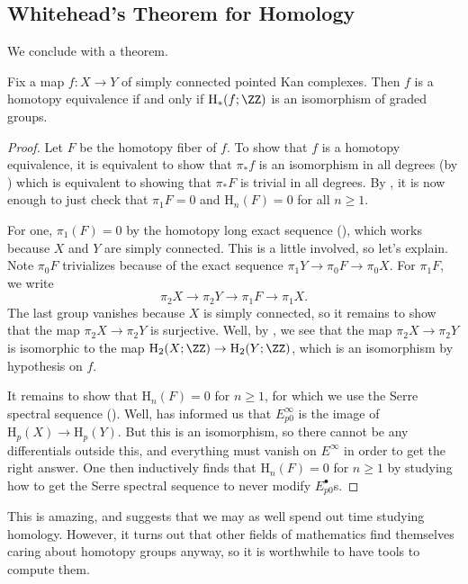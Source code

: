 \documentclass[../notes.tex]{subfiles}
\begin{document}
\subsection{Whitehead's Theorem for Homology}
We conclude with a theorem.
\begin{theorem}
	Fix a map $f\colon X\to Y$ of simply connected pointed Kan complexes. Then $f$ is a homotopy equivalence if and only if $\mathrm H_*(f;\ZZ)$ is an isomorphism of graded groups.
\end{theorem}
\begin{proof}
	Let $F$ be the homotopy fiber of $f$. To show that $f$ is a homotopy equivalence, it is equivalent to show that $\pi_*f$ is an isomorphism in all degrees (by ) which is equivalent to showing that $\pi_*F$ is trivial in all degrees. By , it is now enough to just check that $\pi_1F=0$ and $\mathrm H_n(F)=0$ for all $n\ge1$.
	
	For one, $\pi_1(F)=0$ by the homotopy long exact sequence (), which works because $X$ and $Y$ are simply connected. This is a little involved, so let's explain. Note $\pi_0F$ trivializes because of the exact sequence $\pi_1Y\to\pi_0F\to\pi_0X$. For $\pi_1F$, we write
	\[\pi_2X\to\pi_2Y\to\pi_1F\to\pi_1X.\]
	The last group vanishes because $X$ is simply connected, so it remains to show that the map $\pi_2X\to\pi_2Y$ is surjective. Well, by , we see that the map $\pi_2X\to\pi_2Y$ is isomorphic to the map $\mathrm H_2(X;\ZZ)\to\mathrm H_2(Y;\ZZ)$, which is an isomorphism by hypothesis on $f$.

	It remains to show that $\mathrm H_n(F)=0$ for $n\ge1$, for which we use the Serre spectral sequence (). Well,  has informed us that $E^\infty_{p0}$ is the image of $\mathrm H_p(X)\to\mathrm H_p(Y)$. But this is an isomorphism, so there cannot be any differentials outside this, and everything must vanish on $E^\infty$ in order to get the right answer. One then inductively finds that $\mathrm H_n(F)=0$ for $n\ge1$ by studying how to get the Serre spectral sequence to never modify $E^\bullet_{p0}$s.
\end{proof}
\begin{remark}
	This is amazing, and suggests that we may as well spend out time studying homology. However, it turns out that other fields of mathematics find themselves caring about homotopy groups anyway, so it is worthwhile to have tools to compute them.
\end{remark}
\end{document}
